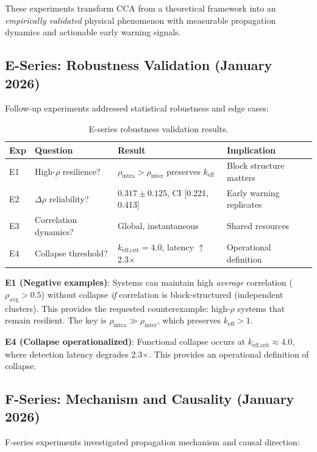 \documentclass[11pt,a4paper]{article}
\theoremstyle{definition}
\theoremstyle{remark}
\newcommand{\keff}{k_{\text{eff}}}
\begin{document}
These experiments transform CCA from a theoretical framework into an \textit{empirically validated} physical phenomenon with measurable propagation dynamics and actionable early warning signals.

\subsection{E-Series: Robustness Validation (January 2026)}

Follow-up experiments addressed statistical robustness and edge cases:

\begin{table}[H]
\centering
\begin{tabular}{llll}
\toprule
\textbf{Exp} & \textbf{Question} & \textbf{Result} & \textbf{Implication} \\
\midrule
E1 & High-$\rho$ resilience? & $\rho_{\text{intra}} > \rho_{\text{inter}}$ preserves $\keff$ & Block structure matters \\
E2 & $\Delta\rho$ reliability? & $0.317 \pm 0.125$, CI [0.221, 0.413] & Early warning replicates \\
E3 & Correlation dynamics? & Global, instantaneous & Shared resources \\
E4 & Collapse threshold? & $k_{\text{eff,crit}} = 4.0$, latency $\uparrow$ 2.3$\times$ & Operational definition \\
\bottomrule
\end{tabular}
\caption{E-series robustness validation results.}
\end{table}

\textbf{E1 (Negative examples)}: Systems can maintain high \textit{average} correlation ($\rho_{\text{avg}} > 0.5$) without collapse \textit{if} correlation is block-structured (independent clusters). This provides the requested counterexample: high-$\rho$ systems that remain resilient. The key is $\rho_{\text{intra}} \gg \rho_{\text{inter}}$, which preserves $\keff > 1$.

\textbf{E4 (Collapse operationalized)}: Functional collapse occurs at $k_{\text{eff,crit}} \approx 4.0$, where detection latency degrades 2.3$\times$. This provides an operational definition of collapse.

\subsection{F-Series: Mechanism and Causality (January 2026)}

F-series experiments investigated propagation mechanism and causal direction:
\end{document}
